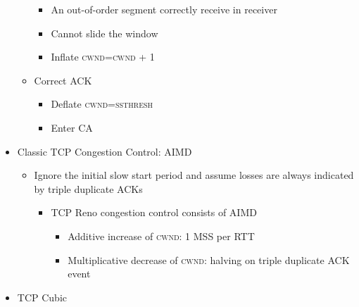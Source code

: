 \begin{itemize}
\begin{itemize}
\begin{itemize}
          \item An out-of-order segment correctly receive in receiver

          \item Cannot slide the window

          \item Inflate \textsc{cwnd=cwnd} + 1

        \end{itemize}

      \item Correct ACK

        \begin{itemize}

          \item Deflate \textsc{cwnd=ssthresh}

          \item Enter CA

        \end{itemize}

    \end{itemize}

  \item Classic TCP Congestion Control: AIMD

    \begin{itemize}

      \item Ignore the initial slow start period and assume losses are always indicated by triple duplicate ACKs

        \begin{itemize}

          \item TCP Reno congestion control consists of AIMD

            \begin{itemize}

              \item Additive increase of \textsc{cwnd}: 1 MSS per RTT

              \item Multiplicative decrease of \textsc{cwnd}: halving on triple duplicate ACK event

            \end{itemize}

        \end{itemize}

    \end{itemize}

  \item TCP Cubic


\end{itemize}
